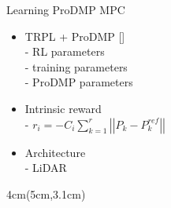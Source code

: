 \documentclass[navbaroff]{sdqbeamer}
\begin{document}
\begin{frame}[label=learn_hybrid]{Learning ProDMP MPC}
    \begin{itemize}
        \item TRPL + ProDMP [\cite{otto_deep_2023}]\\
            \pause
            - RL parameters\\
            \pause
            - training parameters\\
            \pause
            - ProDMP parameters
            \pause
        \item Intrinsic reward\\
            - $r_i=-C_i\sum\limits_{k=1}^{r}\left\vert\left\vert P_k - P_k^{ref}\right\vert\right\vert$
            \pause
            \pause
            \pause
        \item Architecture\\
            - LiDAR
            \pause
    \end{itemize}
    \begin{textblock*}{4cm}(5cm,3.1cm)
    \end{textblock*}
\end{frame}
\end{document}
